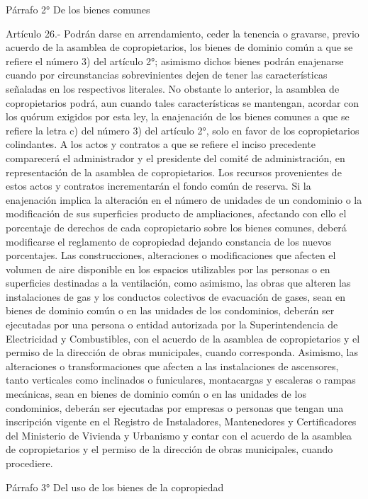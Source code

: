     Párrafo 2°
    De los bienes comunes

     
    Artículo 26.- Podrán darse en arrendamiento, ceder la tenencia o gravarse, previo acuerdo de la asamblea de copropietarios, los bienes de dominio común a que se refiere el número 3) del artículo 2°; asimismo dichos bienes podrán enajenarse cuando por circunstancias sobrevinientes dejen de tener las características señaladas en los respectivos literales. No obstante lo anterior, la asamblea de copropietarios podrá, aun cuando tales características se mantengan, acordar con los quórum exigidos por esta ley, la enajenación de los bienes comunes a que se refiere la letra c) del número 3) del artículo 2°, solo en favor de los copropietarios colindantes.
    A los actos y contratos a que se refiere el inciso precedente comparecerá el administrador y el presidente del comité de administración, en representación de la asamblea de copropietarios. Los recursos provenientes de estos actos y contratos incrementarán el fondo común de reserva.
    Si la enajenación implica la alteración en el número de unidades de un condominio o la modificación de sus superficies producto de ampliaciones, afectando con ello el porcentaje de derechos de cada copropietario sobre los bienes comunes, deberá modificarse el reglamento de copropiedad dejando constancia de los nuevos porcentajes.
    Las construcciones, alteraciones o modificaciones que afecten el volumen de aire disponible en los espacios utilizables por las personas o en superficies destinadas a la ventilación, como asimismo, las obras que alteren las instalaciones de gas y los conductos colectivos de evacuación de gases, sean en bienes de dominio común o en las unidades de los condominios, deberán ser ejecutadas por una persona o entidad autorizada por la Superintendencia de Electricidad y Combustibles, con el acuerdo de la asamblea de copropietarios y el permiso de la dirección de obras municipales, cuando corresponda.
    Asimismo, las alteraciones o transformaciones que afecten a las instalaciones de ascensores, tanto verticales como inclinados o funiculares, montacargas y escaleras o rampas mecánicas, sean en bienes de dominio común o en las unidades de los condominios, deberán ser ejecutadas por empresas o personas que tengan una inscripción vigente en el Registro de Instaladores, Mantenedores y Certificadores del Ministerio de Vivienda y Urbanismo y contar con el acuerdo de la asamblea de copropietarios y el permiso de la dirección de obras municipales, cuando procediere.
     
    Párrafo 3°
    Del uso de los bienes de la copropiedad

